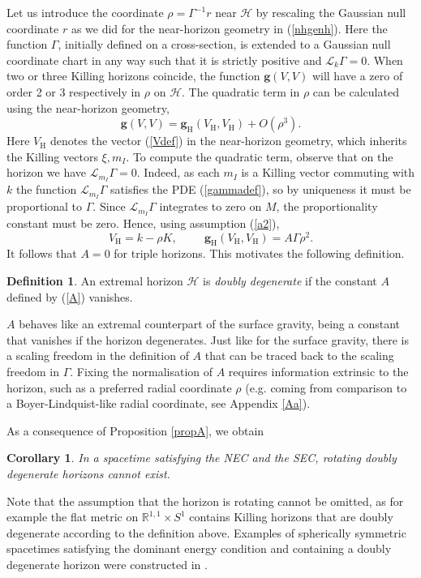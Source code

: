 \documentclass[11pt, reqno]{amsart}
\newcommand{\R}{\mathbb{R}}
\theoremstyle{plain}
\newtheorem{cor}[theorem]{Corollary}
\theoremstyle{definition}
\newtheorem{definition}[theorem]{Definition}
\numberwithin{equation}{section}
\begin{document}
Let us introduce the coordinate $\rho = \Gamma^{-1} r$ near $\mathcal{H}$ by rescaling the Gaussian null coordinate $r$ as we did for the near-horizon geometry in (\ref{nhgenh}). Here the function $\Gamma$, initially defined on a cross-section, is extended to a Gaussian null coordinate chart in any way such that it is strictly positive and $\mathcal{L}_k\Gamma = 0$. When two or three Killing horizons coincide, the function $\textbf{g}(V,V)$ will have a zero of order 2 or 3 respectively in $\rho$ on $\mathcal{H}$. The quadratic term in $\rho$ can be calculated using the near-horizon geometry, 
\begin{equation}
    \textbf{g}(V,V) = \textbf{g}_\text{H}(V_\text{H},V_\text{H}) + O(\rho^3).
\end{equation}
Here $V_{\text{H}}$ denotes the vector (\ref{Vdef}) in the near-horizon geometry, which inherits the Killing vectors $\xi, m_I$.
To compute the quadratic term, observe that on the horizon we have $\mathcal{L}_{m_I}\Gamma = 0$. Indeed, as each $m_I$ is a Killing vector commuting with $k$ the function $\mathcal{L}_{m_I}\Gamma$ satisfies the PDE (\ref{gammadef}), so by uniqueness it must be proportional to $\Gamma$. Since $\mathcal{L}_{m_I}\Gamma$ integrates to zero on $M$, the proportionality constant must be zero. Hence, using assumption (\ref{a2}),
\begin{equation} \label{Vnhg}
    V_{\text{H}} = k - \rho K, \hspace{1cm} \textbf{g}_{\text{H}}(V_{\text{H}}, V_{\text{H}}) = A\Gamma \rho^2.
\end{equation}
It follows that $A = 0$ for triple horizons. This motivates the following definition.
\begin{definition} \label{def}
    An extremal horizon $\mathcal{H}$ is \textit{doubly degenerate} if the constant $A$ defined by (\ref{A}) vanishes.
\end{definition}
$A$ behaves like an extremal counterpart of the surface gravity, being a constant that vanishes if the horizon degenerates. Just like for the surface gravity, there is a scaling freedom in the definition of $A$ that can be traced back to the scaling freedom in $\Gamma$. Fixing the normalisation of $A$ requires information extrinsic to the horizon, such as a preferred radial coordinate $\rho$ (e.g. coming from comparison to a Boyer-Lindquist-like radial coordinate, see Appendix \ref{Aa}).

As a consequence of Proposition \ref{propA}, we obtain
\begin{cor}
    In a spacetime satisfying the NEC and the SEC, rotating doubly degenerate horizons cannot exist.
\end{cor}
Note that the assumption that the horizon is rotating cannot be omitted, as for example the flat metric on $\R^{1,1} \times S^1$ contains Killing horizons that are doubly degenerate according to the definition above. Examples of spherically symmetric spacetimes satisfying the dominant energy condition and containing a doubly degenerate horizon were constructed in \cite{KU22}.
\end{document}
